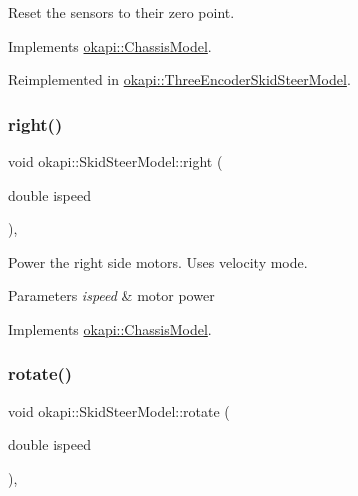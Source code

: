 Reset the sensors to their zero point. 

Implements \mbox{\hyperlink{classokapi_1_1ChassisModel_a6bd7e6bb60d41d3f1f5a5a129acfe1b6}{okapi\+::\+Chassis\+Model}}.



Reimplemented in \mbox{\hyperlink{classokapi_1_1ThreeEncoderSkidSteerModel_a6e4d43a1f3027798c0451c93f8cde057}{okapi\+::\+Three\+Encoder\+Skid\+Steer\+Model}}.

\mbox{\label{classokapi_1_1SkidSteerModel_ada9bd222b5aeaa0507b57906ac59dd3b}} 
\subsubsection{\texorpdfstring{right()}{right()}}
{\footnotesize\ttfamily void okapi\+::\+Skid\+Steer\+Model\+::right (\begin{DoxyParamCaption}\item[{double}]{ispeed }\end{DoxyParamCaption})\hspace{0.3cm}{\ttfamily [override]}, {\ttfamily [virtual]}}

Power the right side motors. Uses velocity mode.


\begin{DoxyParams}{Parameters}
{\em ispeed} & motor power \\
\hline
\end{DoxyParams}


Implements \mbox{\hyperlink{classokapi_1_1ChassisModel_a282fcf947aea9630cadd2c673eb5f7e3}{okapi\+::\+Chassis\+Model}}.

\mbox{\label{classokapi_1_1SkidSteerModel_af02dab85c80cf8aa226b33a39851feff}} 
\subsubsection{\texorpdfstring{rotate()}{rotate()}}
{\footnotesize\ttfamily void okapi\+::\+Skid\+Steer\+Model\+::rotate (\begin{DoxyParamCaption}\item[{double}]{ispeed }\end{DoxyParamCaption})\hspace{0.3cm}{\ttfamily [override]}, {\ttfamily [virtual]}}

